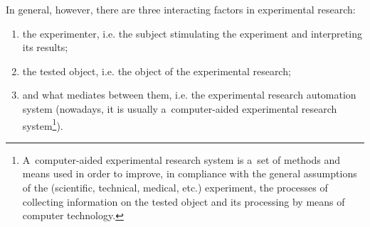 In general, however, there are three interacting factors in experimental research:



\begin{enumerate}

\item the experimenter, i.e. the subject stimulating the experiment and interpreting its results;

\item the tested object, i.e. the object of the experimental research;

\item and what mediates between them, i.e. the experimental research automation system (nowadays, it is usually a~computer-aided experimental research system\footnote{A~computer-aided experimental research system is a~set of methods and means used in order to improve, in compliance with the general assumptions of the (scientific, technical, medical, etc.) experiment, the processes of collecting information on the tested object and its processing by means of computer technology. }).

\end{enumerate}


